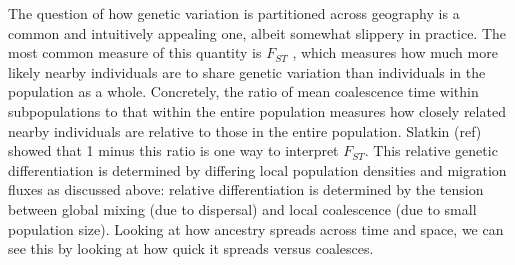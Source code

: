 \documentclass{ar-1col}
\newcommand{\g}[1]{{\color{blue}{#1}}}
\newcommand{\todo}[1]{{\textbf{\color{red}{#1}}}}
\begin{document}
The question of how genetic variation is partitioned across
geography is a common and intuitively appealing one,
albeit somewhat slippery in practice.
The most common measure of this quantity is $F_{ST}$ \cite{wright},
which measures how much more likely nearby individuals are to share genetic variation than individuals in the population as a whole.
Concretely,
the ratio of mean coalescence time within subpopulations
to that within the entire population measures how closely related
nearby individuals are relative to those in the entire population.
Slatkin (ref) showed that 1 minus this ratio is one way to interpret $F_{ST}$.
This relative genetic differentiation is determined by differing local population densities
and migration fluxes as discussed above:
relative differentiation is determined by the tension between global mixing (due to dispersal)
and local coalescence (due to small population size).
Looking at how ancestry spreads across time and space,
we can see this by looking at how quick it spreads versus coalesces.

\todo{tidy and conclude}

\g{refer to ancestry spread figure to build intuition 
for how ancestors can``forget" where their descendants are, 
leading to an asymptote in ibd}


%
%        
%
%
%
%
\end{document}
